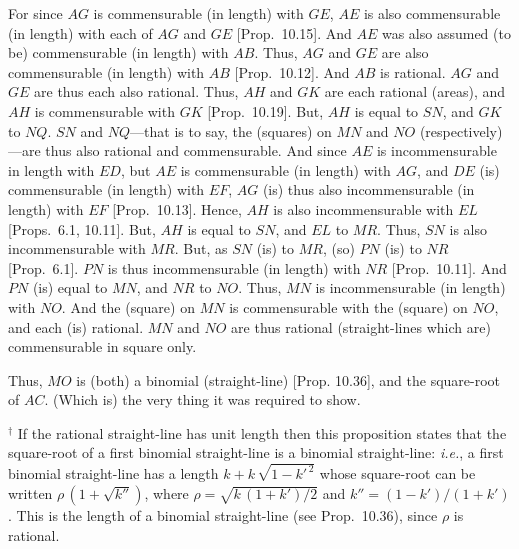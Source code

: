 \begin{Parallel}{}{}
{For since $AG$ is commensurable (in length) with $GE$, $AE$ is also commensurable (in length)
with each of $AG$ and $GE$ [Prop.~10.15]. 
And $AE$ was also assumed (to be) commensurable (in length) with $AB$.  Thus,
$AG$ and $GE$ are also commensurable (in length) with $AB$
[Prop.~10.12]. And $AB$ is rational. $AG$
and $GE$ are thus each also  rational. Thus, $AH$ and $GK$ are each
rational (areas), and $AH$ is commensurable with $GK$ [Prop.~10.19]. But, $AH$ is equal to $SN$,
and $GK$ to $NQ$. $SN$ and $NQ$---that is to say, the (squares)
on $MN$ and $NO$ (respectively)---are thus also rational and commensurable. And since $AE$ is incommensurable in length with $ED$,
but $AE$ is commensurable (in length) with $AG$, and $DE$ (is) commensurable (in length)
with $EF$, $AG$ (is) thus also incommensurable (in length) with $EF$
[Prop.~10.13]. Hence, $AH$ is also incommensurable with $EL$ [Props.~6.1, 10.11]. But, $AH$ is equal to $SN$, and $EL$
to $MR$. Thus, $SN$ is also incommensurable with $MR$. But, as
$SN$ (is) to $MR$, (so) $PN$ (is) to $NR$ [Prop.~6.1].  $PN$ is thus incommensurable (in length) with $NR$ [Prop.~10.11]. And $PN$ (is) equal to $MN$, and $NR$ to
$NO$. Thus, $MN$ is incommensurable (in length) with $NO$. And the (square)
on $MN$ is commensurable with the (square) on $NO$, and each (is)
rational.  $MN$ and $NO$ are thus rational (straight-lines which are)
commensurable in square only.

Thus, $MO$ is (both) a binomial (straight-line) [Prop. 10.36], and the square-root of $AC$.
(Which is) the very thing it was required to show.}
\end{Parallel}
{\footnotesize\noindent $^\dag$ If the rational straight-line has unit length then this proposition states that the square-root of 
a first binomial straight-line is a binomial straight-line: {\em i.e.}, 
a first binomial straight-line has a length $k+k\,\sqrt{1-k'^{\,2}}$ whose
square-root can be written $\rho\,(1+\sqrt{k''})$, where $\rho=\sqrt{k\,(1+k')/2}$ and $k''=(1-k')/(1+k')$. This is the length of a binomial straight-line (see Prop.~10.36), since $\rho$ is rational.}

